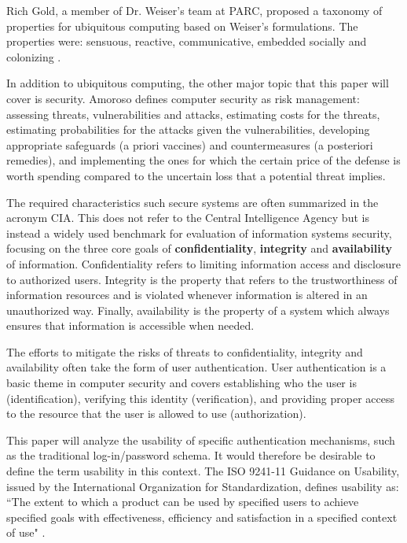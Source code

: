 \documentclass{article}
\begin{document}
Rich Gold, a member of Dr. Weiser’s team at PARC, proposed a taxonomy of properties for ubiquitous computing based on Weiser’s formulations. The properties were: sensuous, reactive, communicative, embedded socially and colonizing \cite{gold2007plenitude}. 

In addition to ubiquitous computing, the other major topic that this paper will cover is security. Amoroso\cite{amoroso1994fundamentals} defines computer security as risk management: assessing threats, vulnerabilities and attacks, estimating costs for the threats, estimating probabilities for the attacks given the vulnerabilities, developing appropriate safeguards (a priori vaccines) and countermeasures (a posteriori remedies), and implementing the ones for which the certain price of the defense is worth spending compared to the uncertain loss that a potential threat implies. 

The required characteristics such secure systems are often summarized in the acronym CIA. This does not refer to the Central Intelligence Agency but is instead a widely used benchmark for evaluation of information systems security, focusing on the three core goals of \textbf{confidentiality}, \textbf{integrity} and \textbf{availability} of information. Confidentiality refers to limiting information access and disclosure to authorized users. Integrity is the property that refers to the trustworthiness of information resources and is violated whenever information is altered in an unauthorized way. Finally, availability is the property of a system which always ensures that information is accessible when needed. 

The efforts to mitigate the risks of threats to confidentiality, integrity and availability often take the form of user authentication. User authentication is a basic theme in computer security and covers establishing who the user is (identification), verifying this identity (verification), and providing proper access to the resource that the user is allowed to use (authorization). 

This paper will analyze the usability of specific authentication mechanisms, such as the traditional log-in/password schema. It would therefore be desirable to define the term usability in this context. The ISO 9241-11 Guidance on Usability, issued by the International Organization for Standardization, defines usability as: ``The extent to which a product can be used by specified users to achieve specified goals with effectiveness, efficiency and satisfaction in a specified context of use" \cite{iso1998international}.
\end{document}
